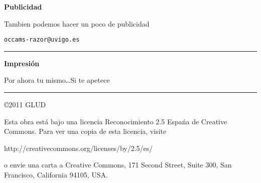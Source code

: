 \begin{textblock}{30}
\begin{minipage}{0.12\linewidth}
\begin{center}
{\bf Publicidad}

\vspace{1mm}

Tambien podemos hacer un poco de publicidad

{\tt occams-razor@uvigo.es}

\vspace{2mm}

\hrule

\vspace{4mm}

{\bf Impresión}

Por ahora tu mismo\ldots Si te apetece

\vspace{2mm}

\hrule

\vspace{6mm}

\copyright  2011 GLUD

Esta obra está bajo una licencia Reconocimiento 2.5 Espańa de Creative
Commons. Para ver una copia de esta licencia, visite 

{\scriptsize http://creativecommons.org/licenses/by/2.5/es/} 

o envie una carta a Creative Commons, 171 Second Street, Suite 300, San Francisco, California 94105, USA.

\medskip


\end{center}
\end{minipage}

\end{textblock}

